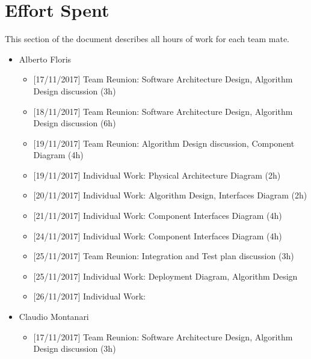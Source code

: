\chapter{Effort Spent}

This section of the document describes all hours of work for each team mate.

\begin{itemize}
    
    \item Alberto Floris
        \begin{itemize}
            \item {[}17/11/2017{]} Team Reunion: Software Architecture Design, Algorithm Design discussion (3h)
            
            \item  {[}18/11/2017{]} Team Reunion: Software Architecture Design, Algorithm Design discussion (6h)
            
            \item {[}19/11/2017{]} Team Reunion: Algorithm Design discussion, Component Diagram (4h)
            
            \item {[}19/11/2017{]} Individual Work: Physical Architecture Diagram (2h)
            
            \item {[}20/11/2017{]} Individual Work: Algorithm Design,  Interfaces Diagram (2h)
            
            \item {[}21/11/2017{]} Individual Work: Component Interfaces Diagram (4h)
            
            \item {[}24/11/2017{]} Individual Work: Component Interfaces Diagram (4h)          

            \item {[}25/11/2017{]} Team Reunion: Integration and Test plan discussion (3h)
            
            \item {[}25/11/2017{]} Individual Work: Deployment Diagram, Algorithm Design
            
            \item {[}26/11/2017{]} Individual Work:
            
        \end{itemize}

    \item Claudio Montanari
        \begin{itemize}
            \item {[}17/11/2017{]} Team Reunion: Software Architecture Design, Algorithm Design discussion (3h)
            

\end{itemize}
\end{itemize}
